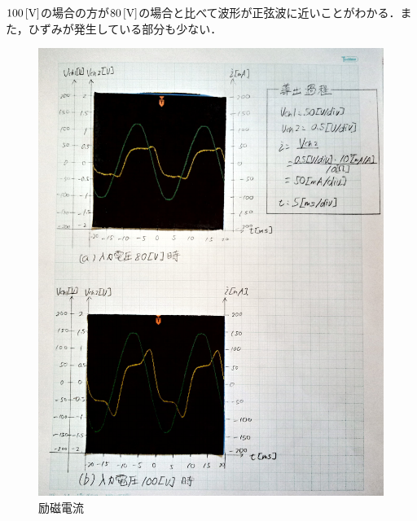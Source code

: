 $100\,[\rm{V}]$の場合の方が$80\,[\rm{V}]$の場合と比べて波形が正弦波に近いことがわかる．また，ひずみが発生している部分も少ない．
\begin{figure}[h]
	\centering
	\includegraphics[scale=0.8]{./data/graph/1.pdf}
	\caption{励磁電流}
	\label{fig:1}
\end{figure}

